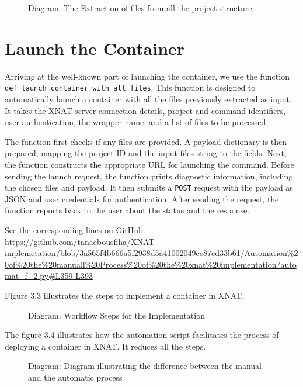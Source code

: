 \begin{figure}[ht]
    \centering
    \def\svgwidth{0.9\linewidth}
    
    \caption{Diagram: The Extraction of files from all the project structure}
    \label{fig:enter-label}
\end{figure}

\section{Launch the Container}

Arriving at the well-known part of launching the container, we use the function \texttt{def launch\_container\_with\_all\_files}. This function is designed to automatically launch a container with all the files previously extracted as input. It takes the XNAT server connection details, project and command identifiers, user authentication, the wrapper name, and a list of files to be processed.

The function first checks if any files are provided. A payload dictionary is then prepared, mapping the project ID and the input files string to the fields. Next, the function constructs the appropriate URL for launching the command. Before sending the launch request, the function prints diagnostic information, including the chosen files and payload. It then submits a \texttt{POST} request with the payload as JSON and user credentials for authentication. After sending the request, the function reports back to the user about the status and the response.




\noindent\footnotesize See the corresponding lines on GitHub:\url{ https://github.com/tanaebousfiha/XNAT-implemetation/blob/3a565f4b666a5f2938d5a41002049ee87cd33b61/Automation%20of%20the%20manuall%20Process%20of%20the%20xnat%20implementation/automat_f_2.py#L359-L393}




Figure 3.3 illustrates the steps to implement a container in XNAT.


\begin{figure}[ht]
    \centering
    \def\svgwidth{0.9\linewidth}
    
    \caption{Diagram: Workflow Steps for the Implementation}
    \label{fig:workflow-steps}
\end{figure}


The figure 3.4 illustrates how the automation script facilitates the process of deploying a container in XNAT. It reduces all the steps.

\begin{figure}[ht]
    \centering
    \def\svgwidth{0.9\linewidth}
    
    \caption{Diagram: Diagram illustrating the difference between the manual and the automatic process}
    \label{fig:enter-label}
\end{figure}






